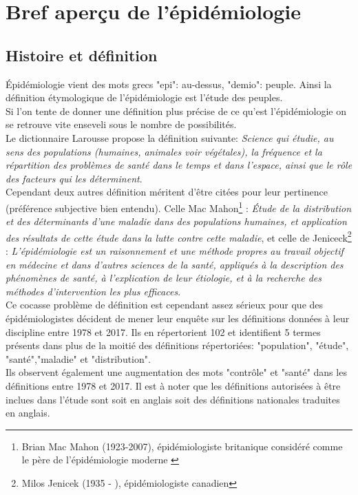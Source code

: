 \documentclass{book}
\begin{document}
\newpage
\section{Bref aperçu de l'épidémiologie}

\subsection{Histoire et définition}

\noindent
Épidémiologie vient des mots grecs "epi": au-dessus, "demio": peuple. Ainsi la définition étymologique de l'épidémiologie est l'étude des peuples.\\
Si l'on tente de donner une définition plus précise de ce qu'est l'épidémiologie on se retrouve vite enseveli sous le nombre de possibilités.\\

\noindent
Le dictionnaire Larousse propose la définition suivante: \textit{Science qui étudie, au sens des populations (humaines, animales voir végétales), la fréquence et la répartition des problèmes de santé dans le temps et dans l'espace, ainsi que le rôle des facteurs qui les déterminent}.\\

\noindent
Cependant deux autres définition méritent d'être citées pour leur pertinence (préférence subjective bien entendu). Celle Mac Mahon\footnote{Brian Mac Mahon (1923-2007), épidémiologiste britanique considéré comme le père de l'épidémiologie moderne \cite{trichopoulos_brian_2008}} : \textit{Étude de la distribution et des déterminants d'une maladie dans des populations humaines, et application des résultats de cette étude dans la lutte contre cette maladie}, et celle de Jeniceck\footnote{Milos Jenicek (1935 - ), épidémiologiste canadien} : \textit{L'épidémiologie est un raisonnement et une méthode propres au travail objectif en médecine et dans d'autres sciences de la santé, appliqués à la description des phénomènes de santé, à l'explication de leur étiologie, et à la recherche des méthodes d'intervention les plus efficaces}.\\

\noindent
Ce cocasse problème de définition est cependant assez sérieux pour que des épidémiologistes décident de mener leur enquête \cite{frerot_what_2018} sur les définitions données à leur discipline entre 1978 et 2017. Ils en répertorient 102 et identifient 5 termes présents dans plus de la moitié des définitions répertoriées: "population", "étude", "santé","maladie" et "distribution".\\
Ils observent également une augmentation des mots "contrôle" et "santé" dans les définitions entre 1978 et 2017. Il est à noter que les définitions autorisées à être inclues dans l'étude sont soit en anglais soit des définitions nationales traduites en anglais.\\
\end{document}
